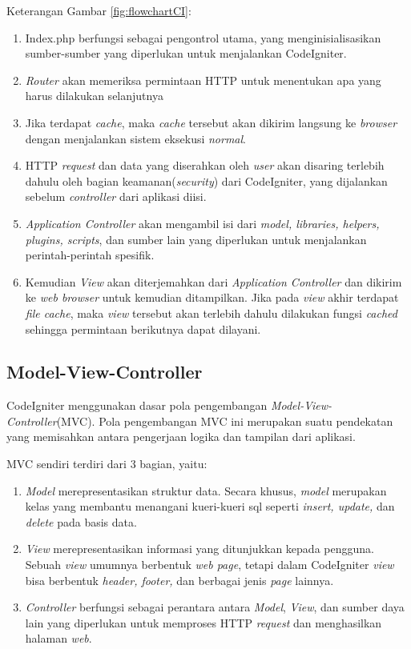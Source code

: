 Keterangan Gambar \ref{fig:flowchartCI}:
\begin{enumerate}
	\item Index.php berfungsi sebagai pengontrol utama, yang menginisialisasikan sumber-sumber yang diperlukan untuk menjalankan CodeIgniter.
	\item \textit{Router} akan memeriksa permintaan HTTP untuk menentukan apa yang harus dilakukan selanjutnya
	\item Jika terdapat \textit{cache}, maka \textit{cache} tersebut akan dikirim langsung ke \textit{browser} dengan menjalankan sistem eksekusi \textit{normal}.
	\item  HTTP \textit{request} dan data yang diserahkan oleh \textit{user} akan disaring terlebih dahulu oleh bagian keamanan(\textit{security}) dari CodeIgniter, yang dijalankan sebelum \textit{controller} dari aplikasi diisi.
	\item \textit{Application Controller} akan mengambil isi dari \textit{model, libraries, helpers, plugins, scripts}, dan sumber lain yang diperlukan untuk menjalankan perintah-perintah spesifik.
	\item Kemudian \textit{View} akan diterjemahkan dari \textit{Application Controller} dan dikirim ke \textit{web browser} untuk kemudian ditampilkan. Jika pada \textit{view} akhir terdapat \textit{file cache}, maka \textit{view} tersebut akan terlebih dahulu dilakukan fungsi \textit{cached} sehingga permintaan berikutnya dapat dilayani.
\end{enumerate}

\subsection{Model-View-Controller}
\label{sub: MVC}

CodeIgniter menggunakan dasar pola pengembangan \textit{Model-View-Controller}(MVC). Pola pengembangan MVC ini merupakan suatu pendekatan yang memisahkan antara pengerjaan logika dan tampilan dari aplikasi.

MVC sendiri terdiri dari 3 bagian, yaitu:
\begin{enumerate}
	\item \textit{Model} merepresentasikan struktur data. Secara khusus, \textit{model} merupakan kelas yang membantu menangani kueri-kueri sql seperti \textit{insert, update,} dan \textit{delete} pada basis data.
	\item \textit{View} merepresentasikan informasi yang ditunjukkan kepada pengguna. Sebuah \textit{view} umumnya berbentuk \textit{web page}, tetapi dalam CodeIgniter \textit{view} bisa berbentuk \textit{header, footer,} dan berbagai jenis \textit{page} lainnya.
	\item \textit{Controller} berfungsi sebagai perantara antara \textit{Model}, \textit{View}, dan sumber daya lain yang diperlukan untuk memproses HTTP \textit{request} dan menghasilkan halaman \textit{web}.
\end{enumerate}


